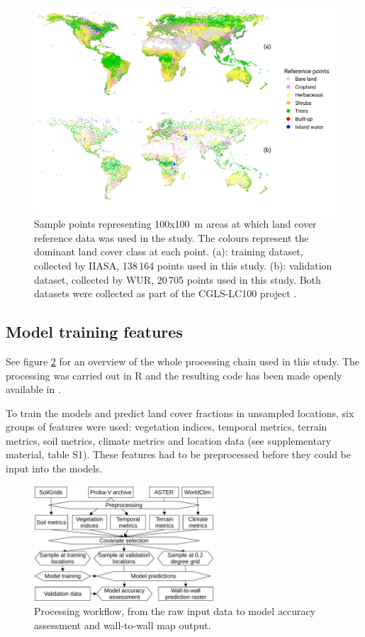 \documentclass[review,authoryear,3p]{elsarticle}
\begin{document}
\begin{figure}
 \includegraphics[width=\textwidth]{article-figures/maps/2020-10-12-training-and-validation}
 \caption{Sample points representing 100x100~m areas at which land cover reference data was used in the study. The colours represent the dominant land cover class at each point. (a): training dataset, collected by \gls{IIASA}, 138\,164 points used in this study. (b): validation dataset, collected by \gls{WUR}, 20\,705 points used in this study. Both datasets were collected as part of the \ac{CGLS-LC100} project \citep{buchhorn_copernicus_2020}.}
 \label{fig-reference-data}
\end{figure}

\subsection{Model training features}

See figure \ref{fig-processing} for an overview of the whole processing chain used in this study.
The processing was carried out in R \citep{r_2019} and the resulting code has been made openly available in \citet{dainius_masiliunas_2020_3973123}.

To train the models and predict land cover fractions in unsampled locations, six groups of features were used: vegetation indices, temporal metrics, terrain metrics, soil metrics, climate metrics and location data (see supplementary material, table S1).
These features had to be preprocessed before they could be input into the models.

\begin{figure}
 \centering
 \includegraphics[width=0.6\textwidth]{article-figures/flowcharts/2020-07-10-flowchart}
 \caption{Processing workflow, from the raw input data to model accuracy assessment and wall-to-wall map output.}
 \label{fig-processing}
\end{figure}
\end{document}

